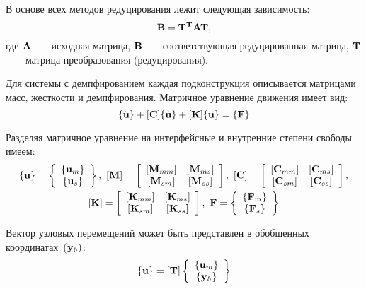 В основе всех методов редуцирования \cite{lib:cms:Belosteckij} лежит следующая зависимость: 
\begin{equation*}
	\mathbf{B} = \mathbf{T}^{\mathbf{T}} \mathbf{A} \mathbf{T},
\end{equation*}
где $ \mathbf{A} $~---~исходная матрица, $ \mathbf{B} $~---~соответствующая редуцированная матрица, $ \mathbf{T} $~---~матрица преобразования (редуцирования).

Для системы с демпфированием каждая подконструкция описывается матрицами масс, жесткости и демпфирования. Матричное уравнение движения имеет вид:
\begin{equation}
	[\mat{M}]\{ \ddot{\mat{u}} \} + [\mat{C}] \{ \dot{\mat{u}} \} + [\mat{K}] \{ \mat{u} \} = \{ \mat{F} \}
\end{equation}

Разделяя матричное уравнение на интерфейсные и внутренние степени свободы имеем:
\begin{gather*}
\{ \mat{u} \} = 
\left\{
\begin{array}{c}
\{ \mat{u}_m \} \\
\{ \mat{u}_s \}
\end{array}
\right\}, \
[ \mat{M} ] = 
\left[
\begin{array}{c c}
[\mat{M}_{mm}] & [\mat{M}_{ms}] \\
{[\mat{M}_{sm}]} & {[\mat{M}_{ss}]} \\
\end{array}
\right], \
[ \mat{C} ] = 
\left[
\begin{array}{c c}
[\mat{C}_{mm}] & [\mat{C}_{ms}] \\
{[\mat{C}_{sm}]} & {[\mat{C}_{ss}]} \\
\end{array}
\right], \\
[ \mat{K} ] = 
\left[
\begin{array}{c c}
[\mat{K}_{mm}] & [\mat{K}_{ms}] \\
{[\mat{K}_{sm}]} & {[\mat{K}_{ss}]} \\
\end{array}
\right], \
{ \mat{F} } = 
\left\{
\begin{array}{c}
\{\mat{F}_m\}\\
\{\mat{F}_s\}\\
\end{array}
\right\}
\end{gather*}

Вектор узловых перемещений может быть представлен в обобщенных координатах~($\mathbf{y}_\updelta)$:
\begin{equation*}
\{ \mathbf{u} \} = [\mathbf{T}]
\left\{
\begin{array}{c}
\{ \mathbf{u}_m \} \\
\{ \mathbf{y}_\updelta \} 
\end{array}
\right\}
\end{equation*}

